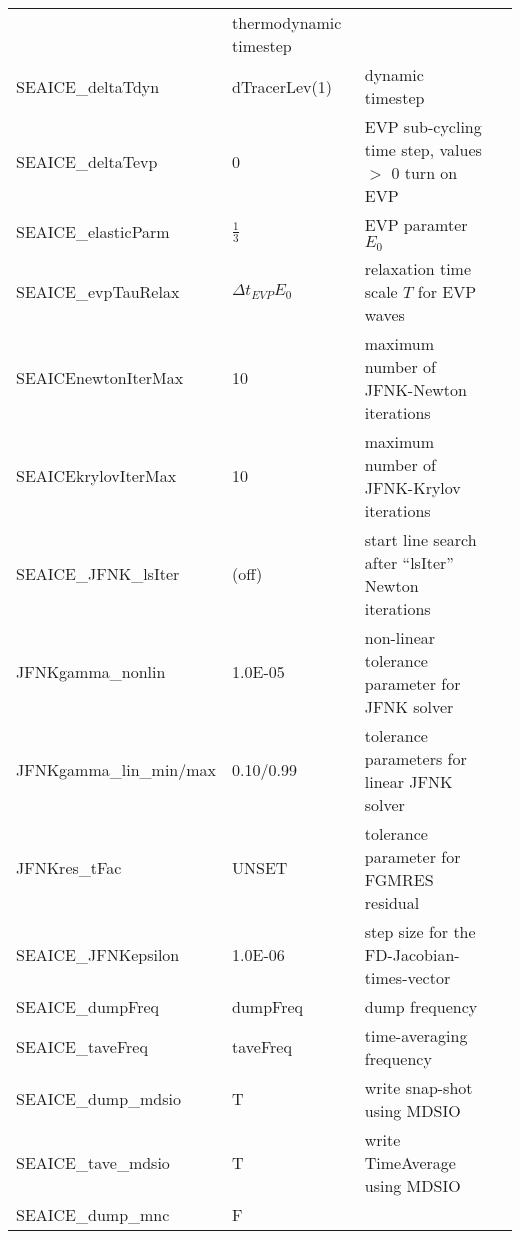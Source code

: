 \begin{table}[!ht]
{\begin{tabular}{|llp{5cm}c|}
    &   thermodynamic timestep 
    &  %
    \\
   SEAICE\_deltaTdyn    &                   dTracerLev(1)
    &   dynamic timestep 
    &  %
    \\
   SEAICE\_deltaTevp    &                   0
    &   EVP sub-cycling time step, values $>$ 0 turn on EVP
    &  %
    \\
   SEAICE\_elasticParm & $\frac{1}{3}$ 
     & EVP paramter $E_0$ & \\
   SEAICE\_evpTauRelax & $\Delta{t}_{EVP}E_0$ 
     & relaxation time scale $T$ for EVP waves & \\
    SEAICEnewtonIterMax & 10
    & maximum number of JFNK-Newton iterations
    &  %
    \\
    SEAICEkrylovIterMax & 10
    & maximum number of JFNK-Krylov iterations
    &  %
    \\
    SEAICE\_JFNK\_lsIter & (off)
    & start line search after ``lsIter'' Newton iterations
    &  %
    \\
    JFNKgamma\_nonlin        & 1.0E-05
    & non-linear tolerance parameter for JFNK solver
    &  %
    \\
    JFNKgamma\_lin\_min/max  & 0.10/0.99
    & tolerance parameters for linear JFNK solver
    &  %
    \\
    JFNKres\_tFac            & UNSET
    & tolerance parameter for FGMRES residual
    &  %
    \\
    SEAICE\_JFNKepsilon      & 1.0E-06
    & step size for the FD-Jacobian-times-vector 
    &  %
    \\
    SEAICE\_dumpFreq     &                   dumpFreq
    &   dump frequency
    &  %
    \\
   SEAICE\_taveFreq     &                   taveFreq
    &   time-averaging frequency 
    &  %
    \\
   SEAICE\_dump\_mdsio   &                     T
    &   write snap-shot   using MDSIO 
    &  %
    \\
   SEAICE\_tave\_mdsio   &                     T
    &   write TimeAverage using MDSIO 
    &  %
    \\
   SEAICE\_dump\_mnc     &                     F

\end{tabular}}
\end{table}
